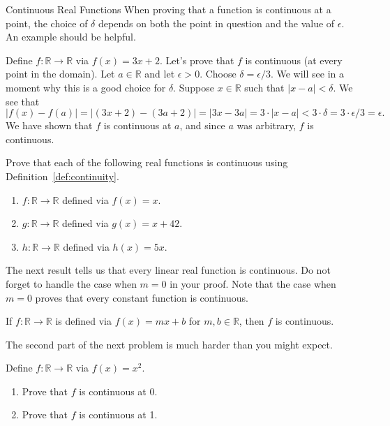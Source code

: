\begin{section}{Continuous Real Functions}
When proving that a function is continuous at a point, the choice of $\delta$ depends on both the point in question and the value of $\epsilon$. An example should be helpful.

\begin{example}
Define $f:\mathbb{R}\to\mathbb{R}$ via $f(x)=3x+2$. Let's prove that $f$ is continuous (at every point in the domain). Let $a\in\mathbb{R}$ and let $\epsilon>0$. Choose $\delta=\epsilon/3$.  We will see in a moment why this is a good choice for $\delta$.  Suppose $x\in\mathbb{R}$ such that $|x-a|<\delta$. We see that
\[
|f(x)-f(a)|=|(3x+2)-(3a+2)|=|3x-3a| = 3\cdot |x-a|<3\cdot \delta = 3\cdot \epsilon/3 =\epsilon.
\]
We have shown that $f$ is continuous at $a$, and since $a$ was arbitrary, $f$ is continuous.
\end{example}

\begin{problem}
Prove that each of the following real functions is continuous using Definition~\ref{def:continuity}.
\begin{enumerate}[label=\textrm{(\alph*)}]
\item $f:\mathbb{R}\to \mathbb{R}$ defined via $f(x)=x$.
\item $g:\mathbb{R}\to \mathbb{R}$ defined via $g(x)=x+42$.
\item $h:\mathbb{R}\to \mathbb{R}$ defined via $h(x)=5x$.
\end{enumerate}
\end{problem}

The next result tells us that every linear real function is continuous. Do not forget to handle the case when $m=0$ in your proof. Note that the case when $m=0$ proves that every constant function is continuous.

\begin{theorem}
If $f:\mathbb{R}\to\mathbb{R}$ is defined via $f(x)=mx+b$ for $m,b\in\mathbb{R}$, then $f$ is continuous.
\end{theorem}

The second part of the next problem is much harder than you might expect.

\begin{problem}
Define $f:\mathbb{R}\to\mathbb{R}$ via $f(x)=x^2$. 
\begin{enumerate}[label=\textrm{(\alph*)}]
\item Prove that $f$ is continuous at 0.
\item Prove that $f$ is continuous at 1.
\end{enumerate}
\end{problem}


\end{section}

